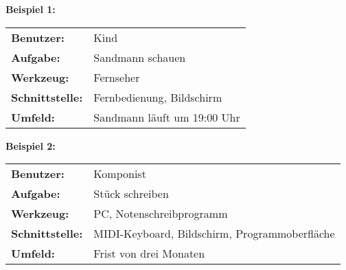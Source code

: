 
\textbf{Beispiel 1:}\\

\begin{tabular}{l l}
\textbf{Benutzer:} & Kind \\
\textbf{Aufgabe:} & Sandmann schauen\\
\textbf{Werkzeug:} & Fernseher\\
\textbf{Schnittstelle:} & Fernbedienung, Bildschirm\\
\textbf{Umfeld:} & Sandmann läuft um 19:00 Uhr
\end{tabular}

\textbf{Beispiel 2:}\\

\begin{tabular}{l l}
\textbf{Benutzer:} & Komponist\\
\textbf{Aufgabe:} & Stück schreiben\\
\textbf{Werkzeug:} & PC, Notenschreibprogramm\\
\textbf{Schnittstelle:} & MIDI-Keyboard, Bildschirm, Programmoberfläche\\
\textbf{Umfeld:} & Frist von drei Monaten
\end{tabular}
